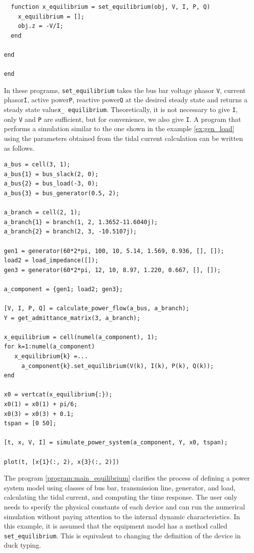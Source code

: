 \documentclass[tombow,dvipdfmx]{corona-a5-1.1}
\begin{document}
\begin{例}
\begin{PROGRAMA}[count,title={load\_impedance.m}]
\begin{verbatim}
  function x_equilibrium = set_equilibrium(obj, V, I, P, Q)
    x_equilibrium = [];
    obj.z = -V/I;
  end

end

end
\end{verbatim}
\end{PROGRAMA}
In these programs, \verb|set_equilibrium| takes the bus bar voltage phasor \verb|V|, current phasor\verb|I|, active power\verb|P|, reactive power\verb|Q| at the desired steady state and returns a steady state value\verb|x_ equilibrium|.
Theoretically, it is not necessary to give \verb|I|, only \verb|V| and \verb|P| are sufficient, but for convenience, we also give \verb|I|.
A program that performs a simulation similar to the one shown in the example \ref{ex:gen_load} using the parameters obtained from the tidal current calculation can be written as follows.

\smallskip
\begin{PROGRAMA}[count,title={main\_simulation\_3bus\_equilibrium.m}]\label{program:main_equilibrium}
\begin{verbatim}
a_bus = cell(3, 1);
a_bus{1} = bus_slack(2, 0);
a_bus{2} = bus_load(-3, 0);
a_bus{3} = bus_generator(0.5, 2);

a_branch = cell(2, 1);
a_branch{1} = branch(1, 2, 1.3652-11.6040j);
a_branch{2} = branch(2, 3, -10.5107j);

gen1 = generator(60*2*pi, 100, 10, 5.14, 1.569, 0.936, [], []);
load2 = load_impedance([]);
gen3 = generator(60*2*pi, 12, 10, 8.97, 1.220, 0.667, [], []);

a_component = {gen1; load2; gen3};

[V, I, P, Q] = calculate_power_flow(a_bus, a_branch);
Y = get_admittance_matrix(3, a_branch);

x_equilibrium = cell(numel(a_component), 1);
for k=1:numel(a_component)
   x_equilibrium{k} =...
     a_component{k}.set_equilibrium(V(k), I(k), P(k), Q(k)); 
end

x0 = vertcat(x_equilibrium{:});
x0(1) = x0(1) + pi/6;
x0(3) = x0(3) + 0.1;
tspan = [0 50];

[t, x, V, I] = simulate_power_system(a_component, Y, x0, tspan);

plot(t, [x{1}(:, 2), x{3}(:, 2)])
\end{verbatim}
\end{PROGRAMA}

The program \ref{program:main_equilibrium} clarifies the process of defining a power system model using classes of bus bar, transmission line, generator, and load, calculating the tidal current, and computing the time response.
The user only needs to specify the physical constants of each device and can run the numerical simulation without paying attention to the internal dynamic characteristics.
In this example, it is assumed that the equipment model has a method called {\verb|set_equilibrium|}.
This is equivalent to changing the definition of the device in duck typing.
\end{例}
\end{document}
